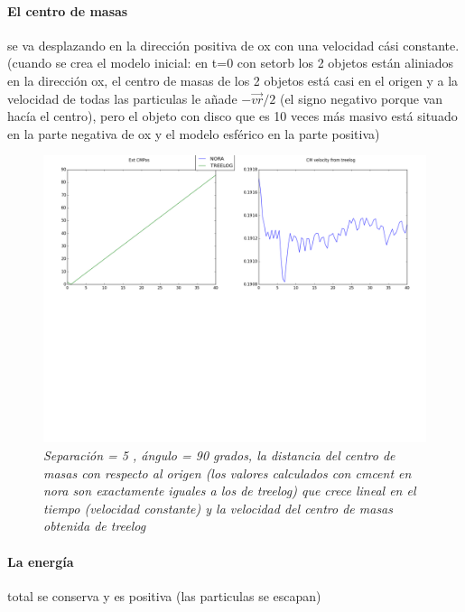 \documentclass[12pt]{article} %
\renewcommand{\=}[1]{\stackrel{#1}{=}} %
\theoremstyle{definition}
\theoremstyle{remark}
\begin{document}
\paragraph{El centro de masas} se va desplazando en la dirección positiva de ox con una velocidad cási constante.(cuando se crea el modelo inicial: en t=0 con setorb los 2 objetos están aliniados en la dirección ox, el centro de masas de los 2 objetos está casi en el origen y a la velocidad de todas las particulas le añade $-\vec{vr}/2 $ (el signo negativo porque van hacía el centro), pero el objeto con disco que es 10 veces más masivo  está situado en la parte negativa de ox y el modelo esférico en la parte positiva)


\begin{figure}[!ht]
 \centering
 \includegraphics[scale=0.2]{cmpos-vel.png}
 \caption{\emph{ Separación = 5 , ángulo = 90 grados, la distancia del centro de masas con respecto al origen (los valores calculados con cmcent en nora son exactamente iguales a los de treelog) que crece lineal en el tiempo (velocidad constante) y la velocidad del centro de masas obtenida de treelog }}
\end{figure}

\paragraph{La energía} total se conserva y es positiva (las particulas se escapan)
\end{document}
